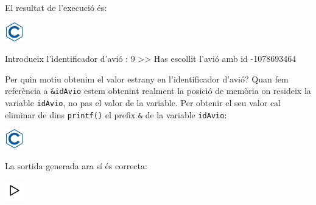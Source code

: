 \documentclass[]{book}
\newenvironment{Shaded}{\begin{snugshade}}{\end{snugshade}}
\newcommand{\DataTypeTok}[1]{\textcolor[rgb]{0.13,0.29,0.53}{#1}}
\newcommand{\DecValTok}[1]{\textcolor[rgb]{0.00,0.00,0.81}{#1}}
\newcommand{\SpecialCharTok}[1]{\textcolor[rgb]{0.00,0.00,0.00}{#1}}
\newcommand{\StringTok}[1]{\textcolor[rgb]{0.31,0.60,0.02}{#1}}
\newcommand{\ImportTok}[1]{#1}
\newcommand{\ControlFlowTok}[1]{\textcolor[rgb]{0.13,0.29,0.53}{\textbf{#1}}}
\newcommand{\PreprocessorTok}[1]{\textcolor[rgb]{0.56,0.35,0.01}{\textit{#1}}}
\newcommand{\NormalTok}[1]{#1}
\begin{document}
El resultat de l'execució és:

\includegraphics{./img/c.png}

\begin{Shaded}
\begin{Highlighting}[]
\NormalTok{Introdueix l'identificador d'avió : }\DecValTok{9}
\NormalTok{>> Has escollit l'avió amb id -}\DecValTok{1078693464}
\end{Highlighting}
\end{Shaded}

Per quin motiu obtenim el valor estrany en l'identificador d'avió? Quan
fem referència a \texttt{\&idAvio} estem obtenint realment la posició de
memòria on resideix la variable \texttt{idAvio}, no pas el valor de la
variable. Per obtenir el seu valor cal eliminar de dins
\texttt{printf()} el prefix \texttt{\&} de la variable \texttt{idAvio}:

\includegraphics{./img/c.png}

\begin{Shaded}
\end{Shaded}

La sortida generada ara sí és correcta:

\includegraphics{./img/play.png}
\end{document}
